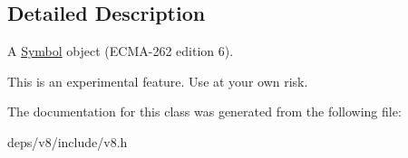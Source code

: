 \subsection{Detailed Description}
A \hyperlink{classv8_1_1_symbol}{Symbol} object (E\+C\+M\+A-\/262 edition 6).

This is an experimental feature. Use at your own risk. 

The documentation for this class was generated from the following file\+:\begin{DoxyCompactItemize}
\item 
deps/v8/include/v8.\+h\end{DoxyCompactItemize}
